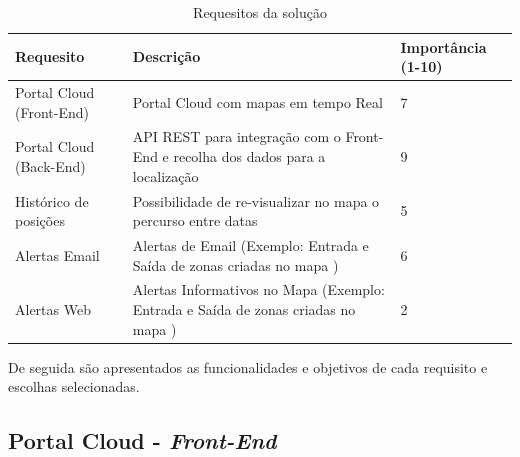 \begin{table}[htb]
\centering
\caption{Requesitos da solução}\label{tab1}
\begin{tabular}{|p{3cm}|p{8cm}|p{2cm}|}\hline
Requesito&Descrição&Importância (1-10)\\\hline

Portal Cloud (Front-End)&Portal Cloud com mapas em tempo Real& 7\\\hline
Portal Cloud (Back-End) & API REST para integração com o Front-End e recolha dos dados para a localização &9\\\hline
Histórico de posições&Possibilidade de re-visualizar no mapa o percurso entre datas&5\\\hline
Alertas Email&Alertas de Email (Exemplo: Entrada e Saída de zonas criadas no mapa )&6\\\hline
Alertas Web&Alertas Informativos no Mapa (Exemplo: Entrada e Saída de zonas criadas no mapa )&2\\\hline
\end{tabular} 
\end{table}

\par
De seguida são apresentados as funcionalidades e objetivos de cada requisito e escolhas selecionadas.

\subsection {Portal Cloud - \textit{Front-End}}

